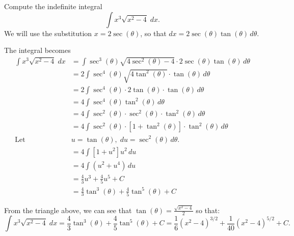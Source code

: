 \documentclass{ximera}
\begin{document}
\begin{example}
Compute the indefinite integral
\[
\int x^3\sqrt{x^2-4} \; dx.
\]
We will use the substitution $x = 2\sec(\theta)$,
so that $dx = 2\sec(\theta)\tan(\theta) \, d\theta$.

The integral becomes
\begin{align*}
\int x^3\sqrt{x^2-4}\; dx &= \int \sec^3(\theta)\sqrt{4\sec^2(\theta)-4}\cdot 2\sec(\theta)\tan(\theta)\, d\theta\\
                           &=  2\int \sec^4(\theta)\sqrt{4\tan^2(\theta)}\cdot \tan(\theta)\, d\theta\\   
                            &=  2\int \sec^4(\theta)\cdot2\tan(\theta)\cdot \tan(\theta)\, d\theta\\ 
                            &=  4\int \sec^4(\theta)\tan^2(\theta)\, d\theta\\ 
                            &=  4\int \sec^2(\theta)\cdot \sec^2(\theta) \cdot \tan^2(\theta)\, d\theta\\  
                            &=  4\int \sec^2(\theta)\cdot [1 + \tan^2(\theta)] \cdot \tan^2(\theta)\, d\theta\\  
                            \text{Let } \; & u = \tan(\theta), \; du = \sec^2(\theta) \, d\theta.\\
                            &=  4\int [1 + u^2]u^2\, du\\ 
                             &=  4\int (u^2 + u^4) \, du\\ 
                             &= \frac43 u^3 + \frac45 u^5 + C\\
                             &= \frac43 \tan^3(\theta) + \frac45 \tan^5(\theta) + C                            
\end{align*}


From the triangle above, we can see that $\tan(\theta) = \frac{\sqrt{x^2-4}}{2}$ so that:
\[
\int x^3\sqrt{x^2-4} \; dx =  \frac43 \tan^3(\theta) + \frac45 \tan^5(\theta) + C =  \frac16 (x^2 - 4)^{3/2} + 
\frac{1}{40} (x^2 - 4)^{5/2} + C.
\]

\end{example}
\end{document}
